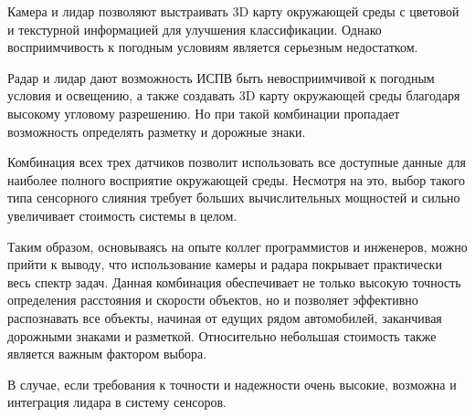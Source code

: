 Камера и лидар позволяют выстраивать 3D карту окружающей среды с цветовой и текстурной информацией для улучшения классификации. Однако восприимчивость к погодным условиям является серьезным недостатком. 

Радар и лидар дают возможность ИСПВ быть невосприимчивой к погодным условия и освещению, а также создавать 3D карту окружающей среды благодаря высокому угловому разрешению. Но при такой комбинации пропадает возможность определять разметку и дорожные знаки. 

Комбинация всех трех датчиков позволит использовать все доступные данные для наиболее полного восприятие окружающей среды. Несмотря на это, выбор такого типа сенсорного слияния требует больших вычислительных мощностей и сильно увеличивает стоимость системы в целом.

Таким образом, основываясь на опыте коллег программистов и инженеров, можно прийти к выводу, что использование камеры и радара покрывает практически весь спектр задач. Данная комбинация обеспечивает не только высокую точность определения расстояния и скорости объектов, но и позволяет эффективно распознавать все объекты, начиная от едущих рядом автомобилей, заканчивая дорожными знаками и разметкой. Относительно небольшая стоимость также является важным фактором выбора. 

В случае, если требования к точности и надежности очень высокие, возможна и интеграция лидара в систему сенсоров. 
